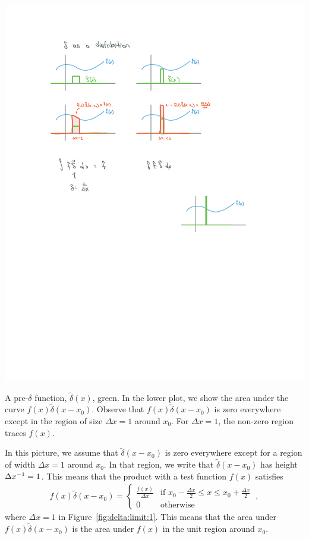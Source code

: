 \begin{subappendices}
\begin{marginfigure}%
    \includegraphics[width=\textwidth]{figures/Delta_limit_01.pdf}
    \caption{A pre-$\delta$ function, $\tilde \delta(x)$, green. In the lower plot, we show the area under the curve $f(x)\tilde\delta(x-x_0)$. Observe that $f(x)\tilde\delta(x-x_0)$ is zero everywhere except in the region of size $\Delta x=1$ around $x_0$. For $\Delta x =1$, the non-zero region traces $f(x)$. }
    \label{fig:delta:limit:1}
\end{marginfigure}

In this picture, we assume that $\tilde\delta(x-x_0)$ is zero everywhere except for a region of width $\Delta x = 1$ around $x_0$. In that region, we write that $\tilde\delta(x-x_0)$ has height $\Delta x^{-1} = 1$. This means that the product with a test function $f(x)$ satisfies
\begin{align}
    f(x)\tilde\delta(x-x_0)
    =
    \begin{cases}
    \frac{f(x)}{\Delta x} &\text{if } x_0-\frac{\Delta x}{2} \leq x \leq x_0 +\frac{\Delta x}{2} \\
    0 &\text{otherwise}
    \end{cases}
    \ ,
\end{align}
where $\Delta x = 1$ in Figure~\ref{fig:delta:limit:1}. This means that the area under $f(x)\tilde\delta(x-x_0)$ is the area under $f(x)$ in the unit region around $x_0$. 


\end{subappendices}
